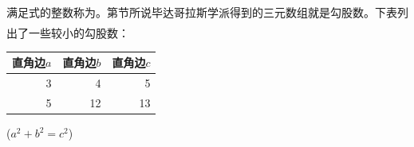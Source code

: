 \documentclass[UTF8]{ctexart}
\newcommand{\upcite}[1]{\textsuperscript{\textsuperscript{\cite{#1}}}}
\begin{document}
满足式的整数称为。第节所说毕达哥拉斯学派得到的三元数组就是勾股数。下表列出了一些较小的勾股数：\upcite{timmurphy.org}


\begin{table}[H]
    \begin{tabular}{|rrr|}
        \hline
        直角边$a$  &  直角边$b$  &  直角边$c$\\
        \hline
        3&4&5\\
        5&12&13\\\hline
    \end{tabular}%
    \qquad
    ($a^2 + b^2 = c^2$)
\end{table}


\nocite{Shiye}

\end{document}
